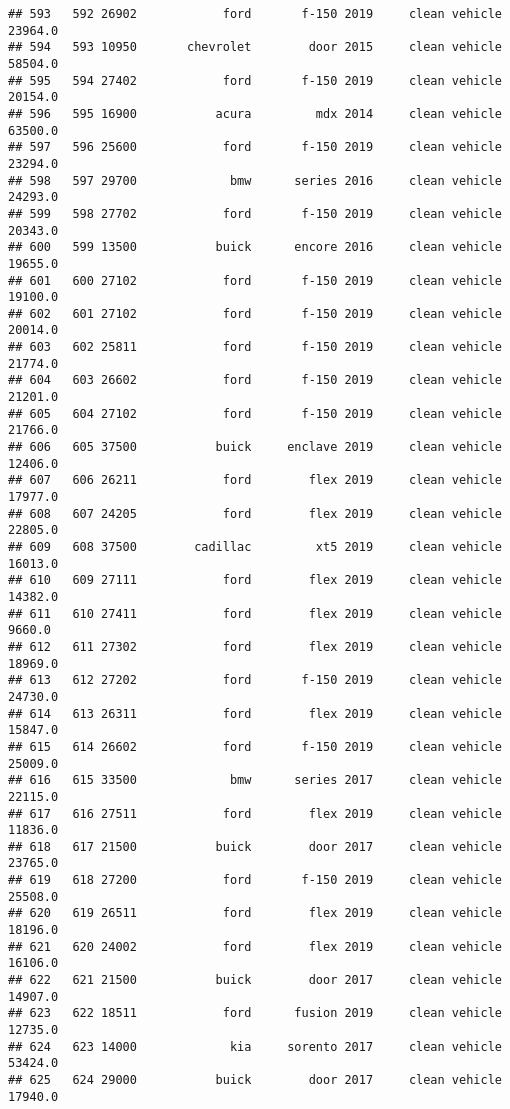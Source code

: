 \documentclass[
]{article}
\begin{document}
\begin{verbatim}
## 593   592 26902            ford       f-150 2019     clean vehicle   23964.0
## 594   593 10950       chevrolet        door 2015     clean vehicle   58504.0
## 595   594 27402            ford       f-150 2019     clean vehicle   20154.0
## 596   595 16900           acura         mdx 2014     clean vehicle   63500.0
## 597   596 25600            ford       f-150 2019     clean vehicle   23294.0
## 598   597 29700             bmw      series 2016     clean vehicle   24293.0
## 599   598 27702            ford       f-150 2019     clean vehicle   20343.0
## 600   599 13500           buick      encore 2016     clean vehicle   19655.0
## 601   600 27102            ford       f-150 2019     clean vehicle   19100.0
## 602   601 27102            ford       f-150 2019     clean vehicle   20014.0
## 603   602 25811            ford       f-150 2019     clean vehicle   21774.0
## 604   603 26602            ford       f-150 2019     clean vehicle   21201.0
## 605   604 27102            ford       f-150 2019     clean vehicle   21766.0
## 606   605 37500           buick     enclave 2019     clean vehicle   12406.0
## 607   606 26211            ford        flex 2019     clean vehicle   17977.0
## 608   607 24205            ford        flex 2019     clean vehicle   22805.0
## 609   608 37500        cadillac         xt5 2019     clean vehicle   16013.0
## 610   609 27111            ford        flex 2019     clean vehicle   14382.0
## 611   610 27411            ford        flex 2019     clean vehicle    9660.0
## 612   611 27302            ford        flex 2019     clean vehicle   18969.0
## 613   612 27202            ford       f-150 2019     clean vehicle   24730.0
## 614   613 26311            ford        flex 2019     clean vehicle   15847.0
## 615   614 26602            ford       f-150 2019     clean vehicle   25009.0
## 616   615 33500             bmw      series 2017     clean vehicle   22115.0
## 617   616 27511            ford        flex 2019     clean vehicle   11836.0
## 618   617 21500           buick        door 2017     clean vehicle   23765.0
## 619   618 27200            ford       f-150 2019     clean vehicle   25508.0
## 620   619 26511            ford        flex 2019     clean vehicle   18196.0
## 621   620 24002            ford        flex 2019     clean vehicle   16106.0
## 622   621 21500           buick        door 2017     clean vehicle   14907.0
## 623   622 18511            ford      fusion 2019     clean vehicle   12735.0
## 624   623 14000             kia     sorento 2017     clean vehicle   53424.0
## 625   624 29000           buick        door 2017     clean vehicle   17940.0

\end{verbatim}
\end{document}
